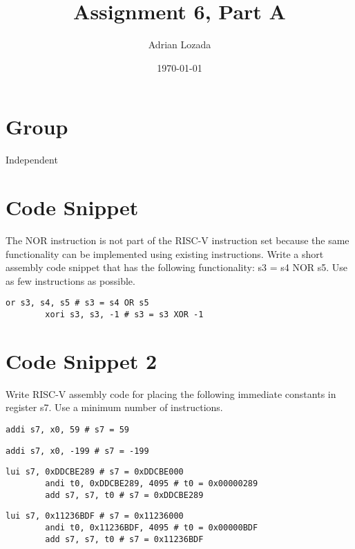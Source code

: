 \documentclass[12pt]{article}
\title{Assignment 6, Part A}
\author{Adrian Lozada}
\date{\today}
\begin{document}
\maketitle
\newpage

    \section{Group}
    Independent

\section{Code Snippet}
    \begin{flushleft}
        The NOR instruction is not part of the RISC-V instruction set because the same 
        functionality can be implemented using existing instructions. Write a short assembly code 
        snippet that has the following functionality: s3 = s4 NOR s5. Use as few instructions as 
        possible.
    \end{flushleft}
    \begin{lstlisting}[language=RISCV]
        or s3, s4, s5 # s3 = s4 OR s5
        xori s3, s3, -1 # s3 = s3 XOR -1
    \end{lstlisting}
    
    \section{Code Snippet 2}
    \begin{flushleft}
        Write RISC-V assembly code for placing the following immediate constants in register s7.
        Use a minimum number of instructions.
    \end{flushleft}
    \begin{lstlisting}[language=RISCV]
        addi s7, x0, 59 # s7 = 59
    \end{lstlisting}
    \begin{lstlisting}[language=RISCV]
        addi s7, x0, -199 # s7 = -199
    \end{lstlisting}
    \begin{lstlisting}[language=RISCV]
        lui s7, 0xDDCBE289 # s7 = 0xDDCBE000
        andi t0, 0xDDCBE289, 4095 # t0 = 0x00000289
        add s7, s7, t0 # s7 = 0xDDCBE289
    \end{lstlisting}
    \begin{lstlisting}[language=RISCV]
        lui s7, 0x11236BDF # s7 = 0x11236000
        andi t0, 0x11236BDF, 4095 # t0 = 0x00000BDF
        add s7, s7, t0 # s7 = 0x11236BDF
    \end{lstlisting}
\end{document}

